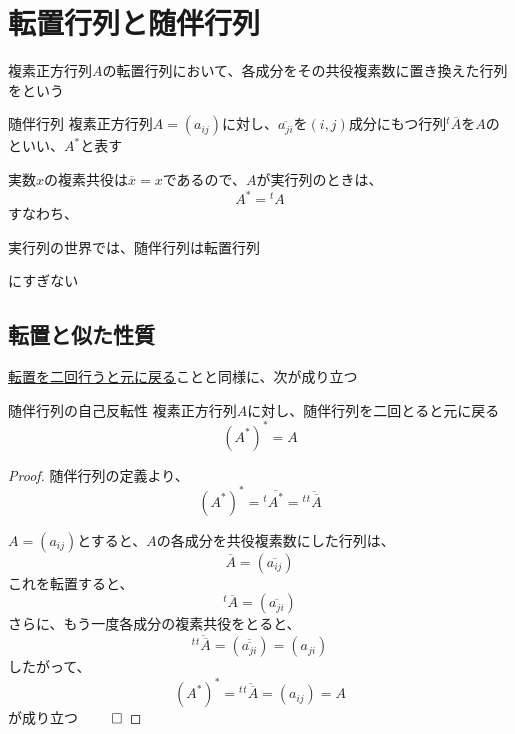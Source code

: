 \documentclass[../../../topic_linear-algebra]{subfiles}
\begin{document}
\sectionline
\section{転置行列と随伴行列}

複素正方行列$A$の転置行列において、各成分をその共役複素数に置き換えた行列をという

\begin{definition}{随伴行列}
  複素正方行列$A = (a_{ij})$に対し、$\overline{a_{ji}}$を$(i,j)$成分にもつ行列${}^t\overline{A}$を$A$のといい、$A^*$と表す
\end{definition}

実数$x$の複素共役は$\overline{x} = x$であるので、$A$が実行列のときは、
\begin{equation*}
  A^* = {}^t A
\end{equation*}
すなわち、
\begin{shaded}
  実行列の世界では、随伴行列は転置行列
\end{shaded}
にすぎない

\subsection{転置と似た性質}

\hyperref[thm:transpose-involution]{転置を二回行うと元に戻る}ことと同様に、次が成り立つ

\begin{theorem}{随伴行列の自己反転性}\label{thm:adjoint-involution}
  複素正方行列$A$に対し、随伴行列を二回とると元に戻る
  \begin{equation*}
    (A^*)^* = A
  \end{equation*}
\end{theorem}

\begin{proof}
  随伴行列の定義より、
  \begin{equation*}
    (A^*)^* = {}^t\overline{A^*} = {}^t\overline{{}^t\overline{A}}
  \end{equation*}

  $A = (a_{ij})$とすると、$A$の各成分を共役複素数にした行列は、
  \begin{equation*}
    \overline{A} = (\overline{a_{ij}})
  \end{equation*}
  これを転置すると、
  \begin{equation*}
    {}^t\overline{A} = (\overline{a_{ji}})
  \end{equation*}
  さらに、もう一度各成分の複素共役をとると、
  \begin{equation*}
    {}^t\overline{{}^t\overline{A}} = (\overline{\overline{a_{ji}}}) = (a_{ji})
  \end{equation*}
  したがって、
  \begin{equation*}
    (A^*)^* = {}^t\overline{{}^t\overline{A}} = (a_{ij}) = A
  \end{equation*}
  が成り立つ $\qed$
\end{proof}
\end{document}
